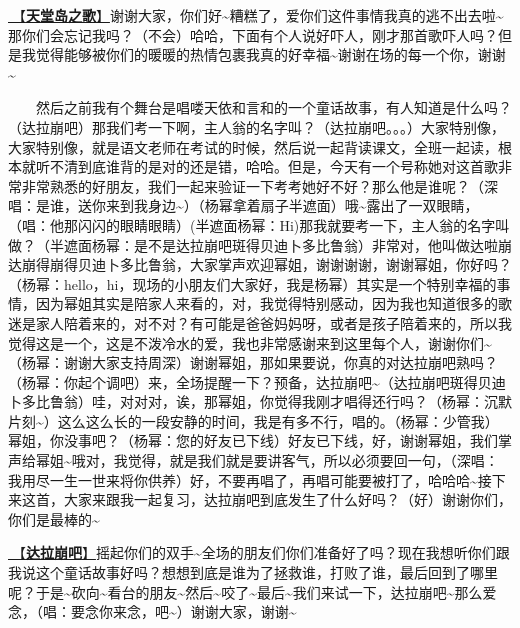 \documentclass[]{ctexbook}
\begin{document}
\hyperref[haven-song]{🎵【\textbf{天堂岛之歌}】}谢谢大家，你们好\textasciitilde 糟糕了，爱你们这件事情我真的逃不出去啦\textasciitilde 那你们会忘记我吗？（不会）哈哈，下面有个人说好吓人，刚才那首歌吓人吗？但是我觉得能够被你们的暖暖的热情包裹我真的好幸福\textasciitilde 谢谢在场的每一个你，谢谢\textasciitilde{}

  然后之前我有个舞台是唱喽天依和言和的一个童话故事，有人知道是什么吗？（达拉崩吧）那我们考一下啊，主人翁的名字叫？（达拉崩吧。。。）大家特别像，大家特别像，就是语文老师在考试的时候，然后说一起背读课文，全班一起读，根本就听不清到底谁背的是对的还是错，哈哈。但是，今天有一个号称她对这首歌非常非常熟悉的好朋友，我们一起来验证一下考考她好不好？那么他是谁呢？（深唱：是谁，送你来到我身边\textasciitilde）（杨幂拿着扇子半遮面）哦\textasciitilde 露出了一双眼睛，（唱：他那闪闪的眼睛眼睛）(半遮面杨幂：Hi)那我就要考一下，主人翁的名字叫做？（半遮面杨幂：是不是达拉崩吧斑得贝迪卜多比鲁翁）非常对，他叫做达啦崩达崩得崩得贝迪卜多比鲁翁，大家掌声欢迎幂姐，谢谢谢谢，谢谢幂姐，你好吗？（杨幂：hello，hi，现场的小朋友们大家好，我是杨幂）其实是一个特别幸福的事情，因为幂姐其实是陪家人来看的，对，我觉得特别感动，因为我也知道很多的歌迷是家人陪着来的，对不对？有可能是爸爸妈妈呀，或者是孩子陪着来的，所以我觉得这是一个，这是不泼冷水的爱，我也非常感谢来到这里每个人，谢谢你们\textasciitilde（杨幂：谢谢大家支持周深）谢谢幂姐，那如果要说，你真的对达拉崩吧熟吗？（杨幂：你起个调吧）来，全场提醒一下？预备，达拉崩吧\textasciitilde（达拉崩吧斑得贝迪卜多比鲁翁）哇，对对对，诶，那幂姐，你觉得我刚才唱得还行吗？（杨幂：沉默片刻\textasciitilde）这么这么长的一段安静的时间，我是有多不行，唱的。（杨幂：少管我）幂姐，你没事吧？（杨幂：您的好友已下线）好友已下线，好，谢谢幂姐，我们掌声给幂姐\textasciitilde 哦对，我觉得，就是我们就是要讲客气，所以必须要回一句，（深唱：我用尽一生一世来将你供养）好，不要再唱了，再唱可能要被打了，哈哈哈\textasciitilde 接下来这首，大家来跟我一起复习，达拉崩吧到底发生了什么好吗？（好）谢谢你们，你们是最棒的\textasciitilde{}

\hyperref[dalabengba]{🎵【\textbf{达拉崩吧}】}摇起你们的双手\textasciitilde 全场的朋友们你们准备好了吗？现在我想听你们跟我说这个童话故事好吗？想想到底是谁为了拯救谁，打败了谁，最后回到了哪里呢？于是\textasciitilde 砍向\textasciitilde 看台的朋友\textasciitilde 然后\textasciitilde 咬了\textasciitilde 最后\textasciitilde 我们来试一下，达拉崩吧\textasciitilde 那么爱念，（唱：要念你来念，吧\textasciitilde）谢谢大家，谢谢\textasciitilde{}
\end{document}
